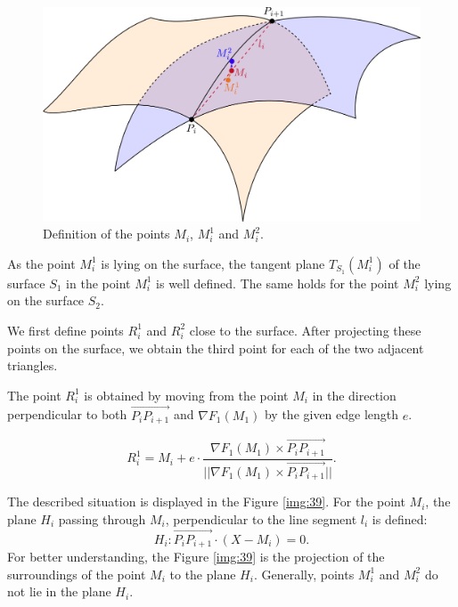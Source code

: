 \begin{figure}
    \centerline{\includegraphics[scale=0.5]{images/img38}}
    \caption[Definition of the points]
    {Definition of the points $M_i$, $M_i^1$ and $M_i^2$.}
    \label{img:38}
\end{figure}

As the point $M_i^1$ is lying on the surface, the tangent plane $T_{S_1}(M_i^1)$ 
of the surface $S_1$ in the point $M_i^1$ is well defined. The same holds for the 
point $M_i^2$ lying on the surface $S_2$. 

We first define points $R_i^1$ and $R_i^2$ close to the surface. After projecting
these points on the surface, we obtain the third point for each of the two 
adjacent triangles.

The point $R_i^1$ is obtained by moving from the point $M_i$ in the direction 
perpendicular to both $\overrightarrow{P_{i} P_{i+1}}$ and 
$\nabla{F_1}(M_1)$ by the given edge length $e$.

$$R_i^1 = M_i + e \cdot \frac{\nabla{F_1}(M_1) \times \overrightarrow{P_{i} P_{i+1}}}{||\nabla{F_1}(M_1) \times \overrightarrow{P_i P_{i+1}}||}.$$

The described situation is displayed in the Figure \ref{img:39}.
For the point $M_i$, the plane $H_i$ passing through $M_i$, perpendicular to the
line segment $l_i$ is defined:
$$H_i : \overrightarrow{P_i P_{i+1}} \cdot (X-M_i) = 0.$$
For better understanding, the Figure \ref{img:39} is the projection of the surroundings
of the point $M_i$ to the plane $H_i$. Generally, points $M_i^1$ and $M_i^2$ do not lie in
the plane $H_i$. 

